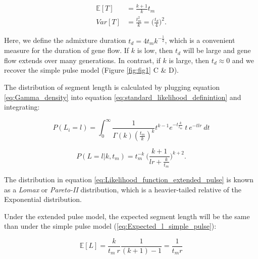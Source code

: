 \documentclass[11pt]{article}
\begin{document}
\begin{equation}
\begin{split}
\label{eq:RV_extended_pulse_properties}
\mathbb{E}[T]&= \frac{k+1}{k}t_{m} \\
	Var[T]&=\frac{t_{m}^2}{k} =
\bigg(\frac{t_d}{4} \bigg)^2 \text{.}
\end{split}
\end{equation}
	
Here, we define the admixture duration $t_d=4t_m k^{-\frac{1}{2}} $, which is a convenient measure for the duration of gene flow. If $k$ is low, then $t_d$ will be large and gene flow extends over many generations. In contrast, if $k$ is large, then $t_d \approx 0$ and we recover the simple pulse model (Figure \ref{fig:fig1} C \& D). 
	
	
The distribution of segment length is calculated by plugging equation \ref{eq:Gamma_density} into  equation  \ref{eq:standard_likelihood_definintion} and integrating:

\begin{equation}
\label{eq:Likelihood_function_extended_pulse_1}
    P(L_i=l) = \int_{0}^{\infty} \frac{1}{\Gamma(k)(\frac{t_m}{k})^k}t^{k-1}e^{-t\frac{k}{t_m}}\ t\ e^{-tl r} \ dt 
\end{equation}	
	
\begin{equation}
\label{eq:Likelihood_function_extended_pulse}
	P(L=l | k, t_m) = t_{m}^{-k} \ \Bigg( \frac{k+1}{l r+\frac{k}{t_{m}}}\Bigg)^{k+2}
	\text{.}
\end{equation}
	
The distribution  in equation \ref{eq:Likelihood_function_extended_pulse} is known as a \emph{Lomax} or \emph{Pareto-II} distribution, which is a heavier-tailed relative of the Exponential distribution. 
	
	
Under the extended pulse model, the expected segment length will be the same than under the simple pulse model (\ref{eq:Expected_l_simple_pulse}):
	
\begin{equation}
\label{eq:Expected_l_extended_pulse}
    \mathbb{E}[L] = \frac{k}{t_m \:r}\frac{1}{(k+1)-1} = \frac{1}{t_{m} r}
\end{equation}
	
	
\end{document}
